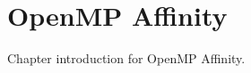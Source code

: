 \pagebreak
\chapter{OpenMP Affinity}
\label{chap:openmp_affinity}

Chapter introduction for OpenMP Affinity.
